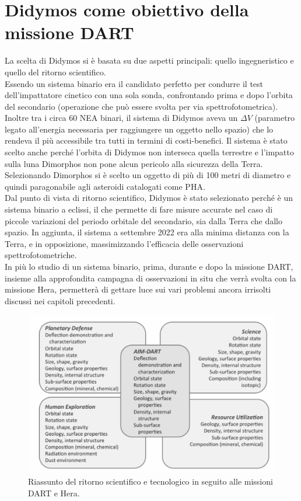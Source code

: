 \documentclass[a4paper,11pt,openright]{book}
\begin{document}
\section{Didymos come obiettivo della missione DART}
La scelta di Didymos si è basata su due aspetti principali: quello ingegneristico e quello del ritorno scientifico.\\
Essendo un sistema binario era il candidato perfetto per condurre il test dell'impattatore cinetico con una sola sonda, confrontando prima e dopo l'orbita del secondario (operazione che può essere svolta per via spettrofotometrica). Inoltre tra i circa 60 NEA binari, il sistema di Didymos aveva un $\Delta V$ (parametro legato all'energia necessaria per raggiungere un oggetto nello spazio) che lo rendeva il più accessibile tra tutti in termini di costi-benefici. Il sistema è stato scelto anche perché l'orbita di Didymos non interseca quella terrestre e l'impatto sulla luna Dimorphos non pone alcun pericolo alla sicurezza della Terra. Selezionando Dimorphos si è scelto un oggetto di più di 100 metri di diametro e quindi paragonabile agli asteroidi catalogati come PHA.\\
Dal punto di vista di ritorno scientifico, Didymos è stato selezionato perché è un sistema binario a eclissi, il che permette di fare misure accurate nel caso di piccole variazioni del periodo orbitale del secondario, sia dalla Terra che dallo spazio. In aggiunta, il sistema a settembre 2022 era alla minima distanza con la Terra, e in opposizione, massimizzando l'efficacia delle osservazioni spettrofotometriche.\\
In più lo studio di un sistema binario, prima, durante e dopo la missione DART, insieme alla approfondita campagna di osservazioni in situ che verrà svolta con la missione Hera, permetterà di gettare luce sui vari problemi ancora irrisolti discussi nei capitoli precedenti.

\begin{figure}[!h]
    \centering
    \includegraphics[width=\textwidth]{figure/Michel et al.png}
    \caption[Riassunto del ritorno scientifico e tecnologico in seguito alle missioni DART e Hera.]{Riassunto del ritorno scientifico e tecnologico in seguito alle missioni DART e Hera. \citep{MICHEL20162529}}
    \label{fig:ritorno_scientifico}
\end{figure}
\end{document}
